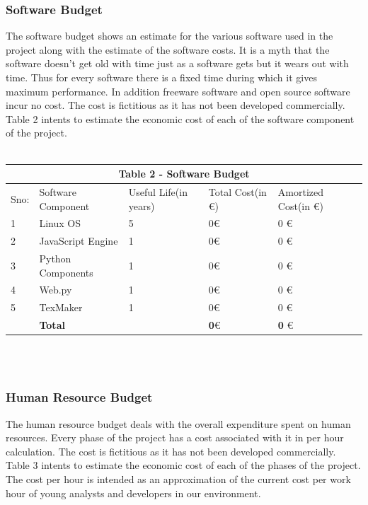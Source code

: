 \subsubsection{Software Budget}
The software budget shows an estimate for the various software used in the project along with
the estimate of the software costs. It is a myth that the software doesn’t get old with time just
as a software gets but it wears out with time. Thus for every software there is a fixed time
during which it gives maximum performance. In addition freeware software and open source
software incur no cost. The cost is fictitious as it has not been developed commercially. Table 2
intents to estimate the economic cost of each of the software component of the project.
\\ \\
\begin{tabular}{|p{1cm}||p{3cm}|p{2cm}|p{3cm}|p{3cm}|}
 \hline
 \multicolumn{5}{|c|}{Table 2 - Software Budget} \\
 \hline
 Sno: & Software Component&Useful Life(in years) &Total Cost(in \euro) &Amortized Cost(in \euro)\\
 \hline
1   & Linux OS  &5 &  0\euro  & 0 \euro \\
2   & JavaScript Engine  &1 &  0\euro  & 0 \euro \\
3   & Python Components  &1 &  0\euro  & 0 \euro \\
4   & Web.py  &1 &  0\euro  & 0 \euro \\
5   & TexMaker  &1 &  0\euro  & 0 \euro \\

\hline
\hline
   & \textbf{Total}  &  &  \textbf{0}\euro  & \textbf{0} \euro \\
 \hline
\end{tabular}
\\ \\ 
\subsubsection{Human Resource Budget}
The human resource budget deals with the overall expenditure spent on human resources.
Every phase of the project has a cost associated with it in per hour calculation.
The cost is fictitious as it has not been developed commercially. Table 3 intents to estimate the
economic cost of each of the phases of the project. The cost per hour is intended as an
approximation of the current cost per work hour of young analysts and developers in our
environment.\\


